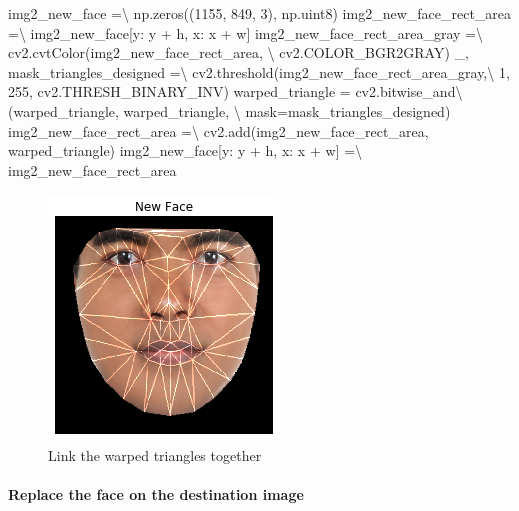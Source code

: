\documentclass[12pt, a4paper, twocolumn]{article}
\newenvironment{Shaded}{}{}
\newcommand{\DecValTok}[1]{\textcolor[rgb]{0.25,0.63,0.44}{#1}}
\newcommand{\OperatorTok}[1]{\textcolor[rgb]{0.40,0.40,0.40}{#1}}
\newcommand{\NormalTok}[1]{#1}
\let\oldparagraph\paragraph
\renewcommand{\paragraph}[1]{\oldparagraph{#1}\mbox{}}
\begin{document}
\begin{Shaded}
\small
\begin{Highlighting}[]
\NormalTok{img2_new_face }\OperatorTok{=}\OperatorTok{\textbackslash{}}
\NormalTok{}\NormalTok{ np.zeros((}\DecValTok{1155}\NormalTok{, }\DecValTok{849}\NormalTok{, }\DecValTok{3}\NormalTok{), np.uint8)}
\NormalTok{img2_new_face_rect_area }\OperatorTok{=}\OperatorTok{\textbackslash{}}
\NormalTok{}\NormalTok{ img2_new_face[y: y }\OperatorTok{+}\NormalTok{ h, x: x }\OperatorTok{+}\NormalTok{ w]}
\NormalTok{img2_new_face_rect_area_gray }\OperatorTok{=}\OperatorTok{\textbackslash{}}
\NormalTok{}\NormalTok{ cv2.cvtColor(img2_new_face_rect_area, }\OperatorTok{\textbackslash{}}
\NormalTok{cv2.COLOR_BGR2GRAY)}
\NormalTok{_, mask_triangles_designed }\OperatorTok{=}\OperatorTok{\textbackslash{}}
\NormalTok{cv2.threshold(img2_new_face_rect_area_gray,}\OperatorTok{\textbackslash{}}
\DecValTok{1}\NormalTok{, }\DecValTok{255}\NormalTok{, cv2.THRESH_BINARY_INV)}
\NormalTok{warped_triangle }\OperatorTok{=}\NormalTok{ cv2.bitwise_and}\OperatorTok{\textbackslash{}}
\NormalTok{(warped_triangle, warped_triangle, }\OperatorTok{\textbackslash{}}
\NormalTok{mask}\OperatorTok{=}\NormalTok{mask_triangles_designed)}
\NormalTok{img2_new_face_rect_area }\OperatorTok{=}\OperatorTok{\textbackslash{}}
\NormalTok{cv2.add(img2_new_face_rect_area, warped_triangle)}
\NormalTok{img2_new_face[y: y }\OperatorTok{+}\NormalTok{ h, x: x }\OperatorTok{+}\NormalTok{ w] }\OperatorTok{=}\OperatorTok{\textbackslash{}}
\NormalTok{img2_new_face_rect_area}
\end{Highlighting}
\end{Shaded}

\begin{figure}
	\centering
	\includegraphics{meta/output_36_0.png}
	\caption{Link the warped triangles together}
\end{figure}

\paragraph{Replace the face on the destination image}\label{header-n166}
\end{document}
